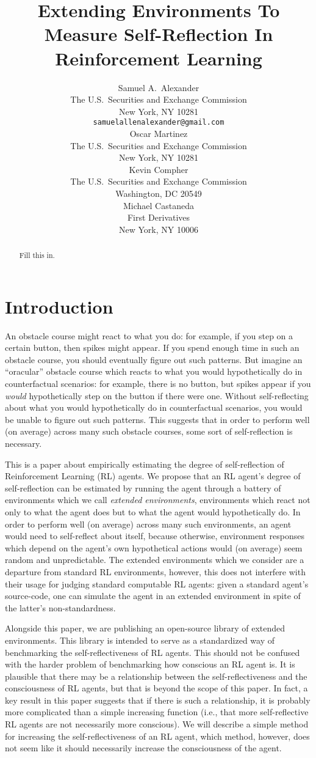\documentclass{article}
\title{Extending Environments To Measure Self-Reflection In Reinforcement Learning}
\author{
  Samuel A.~Alexander\\
  The U.S.\ Securities and Exchange Commission\\
  New York, NY 10281\\
  \texttt{samuelallenalexander@gmail.com}\\
  \And
  Oscar Martinez\\
  The U.S.\ Securities and Exchange Commission\\
  New York, NY 10281\\
  \And
  Kevin Compher\\
  The U.S.\ Securities and Exchange Commission\\
  Washington, DC 20549\\
  \And
  Michael Castaneda\\
  First Derivatives\\
  New York, NY 10006\\
}
\begin{document}
\maketitle

\begin{abstract}
  Fill this in.
\end{abstract}

\section{Introduction}

An obstacle course might react to what you do: for example, if you step on a certain
button, then spikes might appear. If you spend enough time in such an obstacle course,
you should eventually figure out such patterns.
But imagine an ``oracular'' obstacle course which reacts to
what you would hypothetically do in counterfactual scenarios: for example, there is
no button, but spikes appear
if you \emph{would} hypothetically step on the button if there were one. Without
self-reflecting about what you would hypothetically do in counterfactual scenarios, you
would be unable to figure out such patterns. This suggests that in order to perform
well (on average) across many such obstacle courses, some sort of self-reflection is
necessary.

This is a paper about empirically estimating the degree of self-reflection of
Reinforcement Learning (RL) agents. We propose that an RL agent's degree of self-reflection
can be estimated by running the agent through a battery of environments which we call
\emph{extended environments}, environments which react not only to what the agent does
but to what the agent would hypothetically do. In order to perform well (on average)
across many such environments, an agent would need to self-reflect about itself, because
otherwise, environment responses which depend on the agent's own hypothetical actions
would (on average) seem random and unpredictable. The extended environments which we
consider are a departure from standard RL environments, however, this does not interfere
with their usage for judging standard computable RL agents: given a standard agent's
source-code, one can simulate the agent in an extended environment in spite of the
latter's non-standardness.

Alongside this paper, we are publishing an open-source library of extended
environments. This library is intended to serve as a standardized way of
benchmarking the self-reflectiveness of RL agents. This should not be confused
with the harder problem of benchmarking how conscious an RL agent is. It is
plausible that there may be a relationship between the self-reflectiveness and
the consciousness of RL agents, but that is beyond the scope of this paper.
In fact, a key result in this paper suggests that if there is such a relationship,
it is probably more complicated than a simple increasing function (i.e., that
more self-reflective RL agents are not necessarily more conscious). We will describe
a simple method for increasing the self-reflectiveness of an RL agent, which method,
however, does not seem like it should necessarily increase the consciousness of
the agent.
\end{document}

